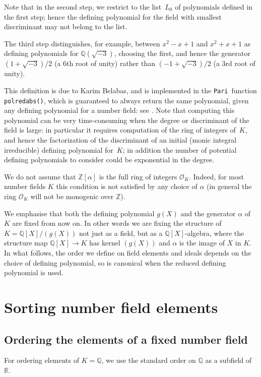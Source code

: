 \documentclass{article}
\def\Pari{{\tt Pari}}
\def\Z{{\mathbb Z}}
\def\Q{{\mathbb Q}}
\def\R{{\mathbb R}}
\def\OO{{\mathcal O}}
\begin{document}
Note that in the second step, we restrict to the list~$L_0$ of
polynomials defined in the first step; hence the defining polynomial
for the field with smallest discriminant may not belong to the list.

The third step distinguishes, for example, between $x^2-x+1$ and
$x^2+x+1$ as defining polynomials for $\Q(\sqrt{-3})$, choosing the
first, and hence the generator $(1+\sqrt{-3})/2$ (a 6th root of unity)
rather than $(-1+\sqrt{-3})/2$ (a 3rd root of unity).

This definition is due to Karim Belabas, and is implemented in the
\Pari\ function {\tt polredabs()}, which is guaranteed to always
return the same polynomial, given any defining polynomial for a number
field: see \cite{polredabs}.  Note that computing this polynomial can
be very time-consuming when the degree or discriminant of the field is
large: in particular it requires computation of the ring of integers
of~$K$, and hence the factorization of the discriminant of an initial
(monic integral irreducible) defining polynomial for~$K$; in addition the number
of potential defining polynomials to consider could be exponential in the
degree.

We do not assume that $\Z[\alpha]$ is the full ring of integers
$\OO_K$.  Indeed, for most number fields $K$ this condition is
not satisfied by any choice of $\alpha$ (in general the ring $\OO_K$
will not be monogenic over $\Z$).

We emphasise that both the defining polynomial $g(X)$ and the
generator $\alpha$ of~$K$ are fixed from now on.  In other words we
are fixing the structure of $K=\Q[X]/(g(X))$ not just as a field, but
as a $\Q[X]$-algebra, where the structure map $\Q[X]\to K$ has kernel
$(g(X))$ and $\alpha$ is the image of $X$ in $K$.  In what follows,
the order we define on field elements and ideals depends on the choice
of defining polynomial, so is canonical when the reduced defining
polynomial is used.

\section{Sorting number field elements}
\subsection{Ordering the elements of a fixed number field}\label{sec:ordfix}
For ordering elements of $K=\Q$, we use the standard order on $\Q$ as
a subfield of~$\R$.
\end{document}
